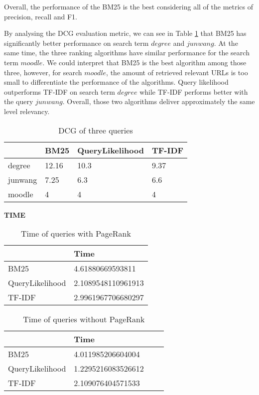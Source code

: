 Overall, the performance of the BM25 is the best considering all of the metrics of precision, recall and F1. 

By analysing the DCG evaluation metric, we can see in Table \ref{tab:dcg} that BM25 has significantly better performance on search term $degree$ and $jun wang$. At the same time, the three ranking algorithms have similar performance for the search term $moodle$. We could interpret that BM25 is the best algorithm among those three, however, for search $moodle$, the amount of retrieved relevant URLs is too small to differentiate the performance of the algorithms. Query likelihood outperforms TF-IDF on search term $degree$ while TF-IDF performs better with the query $jun wang$. Overall, those two algorithms deliver approximately the same level relevancy.


\begin{table}[]
\centering
\caption{DCG of three queries}
\label{tab:dcg}
\begin{tabular}{|l|l|l|l|}
\hline
        & BM25  & QueryLikelihood & TF-IDF \\ \hline
degree  & 12.16 & 10.3            & 9.37   \\ \hline
junwang & 7.25  & 6.3             & 6.6    \\ \hline
moodle  & 4     & 4               & 4      \\ \hline
\end{tabular}
\end{table}

\textbf{TIME}

\begin{table}[]
\centering
\caption{Time of queries with PageRank}
\label{tab:time}
\begin{tabular}{|l|l|}
\hline
        & Time  \\ \hline
BM25            & 4.61880669593811 \\ \hline
QueryLikelihood & 2.1089548110961913\\ \hline
TF-IDF          & 2.9961967706680297\\ \hline
\end{tabular}
\end{table}

\begin{table}[]
\centering
\caption{Time of queries without PageRank}
\label{tab:time_pr}
\begin{tabular}{|l|l|l|l|}
\hline
        & Time  \\ \hline
BM25            & 4.011985206604004 \\ \hline
QueryLikelihood & 1.2295216083526612\\ \hline
TF-IDF          & 2.109076404571533 \\ \hline
\end{tabular}
\end{table}

